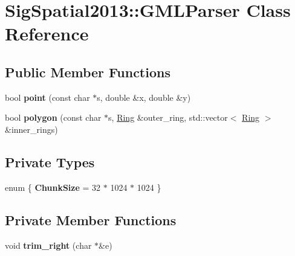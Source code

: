 \hypertarget{classSigSpatial2013_1_1GMLParser}{\section{Sig\-Spatial2013\-:\-:G\-M\-L\-Parser Class Reference}
\label{classSigSpatial2013_1_1GMLParser}
}
\subsection*{Public Member Functions}
\begin{DoxyCompactItemize}
\item 
\hypertarget{classSigSpatial2013_1_1GMLParser_a4d8bb7775390292c88846443207c44a6}{bool {\bfseries point} (const char $\ast$s, double \&x, double \&y)}\label{classSigSpatial2013_1_1GMLParser_a4d8bb7775390292c88846443207c44a6}

\item 
\hypertarget{classSigSpatial2013_1_1GMLParser_a44dc46fca44950badfad489e790060be}{bool {\bfseries polygon} (const char $\ast$s, \hyperlink{structSigSpatial2013_1_1Ring}{Ring} \&outer\-\_\-ring, std\-::vector$<$ \hyperlink{structSigSpatial2013_1_1Ring}{Ring} $>$ \&inner\-\_\-rings)}\label{classSigSpatial2013_1_1GMLParser_a44dc46fca44950badfad489e790060be}

\end{DoxyCompactItemize}
\subsection*{Private Types}
\begin{DoxyCompactItemize}
\item 
enum \{ {\bfseries Chunk\-Size} = 32 $\ast$ 1024 $\ast$ 1024
 \}
\end{DoxyCompactItemize}
\subsection*{Private Member Functions}
\begin{DoxyCompactItemize}
\item 
\hypertarget{classSigSpatial2013_1_1GMLParser_a57eafa968caebbba840d6a58a2c562dc}{void {\bfseries trim\-\_\-right} (char $\ast$\&e)}\label{classSigSpatial2013_1_1GMLParser_a57eafa968caebbba840d6a58a2c562dc}

\end{DoxyCompactItemize}
